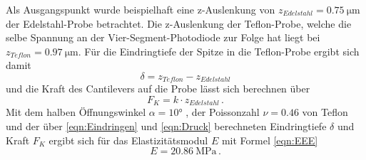         Als Ausgangspunkt wurde beispielhaft eine z-Auslenkung von $z_{Edelstahl}=\SI{0.75}{\micro\metre}$ der Edelstahl-Probe betrachtet. Die z-Auslenkung der Teflon-Probe, welche die selbe Spannung an der Vier-Segment-Photodiode zur Folge hat liegt bei $z_{Teflon}=\SI{0.97}{\micro\metre}$. Für die Eindringtiefe der Spitze in die Teflon-Probe ergibt sich damit
        \begin{equation}
            \delta = z_{Teflon} - z_{Edelstahl}
            \label{eqn:Eindringen}
        \end{equation}
        und die Kraft des Cantilevers auf die Probe lässt sich berechnen über
        \begin{equation}
            F_K = k\cdot z_{Edelstahl} \, .
            \label{eqn:Druck}
        \end{equation}
        Mit dem halben Öffnungswinkel $\alpha = 10°$ \cite{tu_dortmund_versuchsanleitung_nodate}, der Poissonzahl $\nu = 0.46$ von Teflon \cite{DuPont} und der über \ref{eqn:Eindringen} und \ref{eqn:Druck} berechneten Eindringtiefe $\delta$ und Kraft $F_K$ ergibt sich für das Elastizitätsmodul $E$ mit Formel \ref{eqn:EEE}
        \begin{equation}
            E = \SI{20.86}{\mega\pascal} \, .
        \end{equation}

